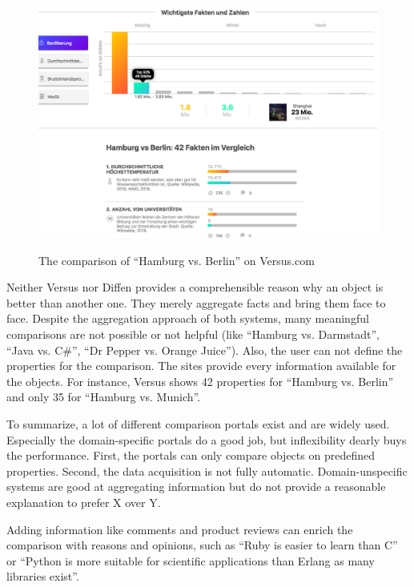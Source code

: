\begin{figure}[h]
\includegraphics[width=1\textwidth]{images/ds-sys/versus}
\label{img:versus}
\caption{The comparison of \enquote{Hamburg vs. Berlin} on Versus.com}
\end{figure}

Neither Versus nor Diffen provides a comprehensible reason why an object is better than another one. They merely aggregate facts and bring them face to face. Despite the aggregation approach of both systems, many meaningful comparisons are not possible or not helpful (like \enquote{Hamburg vs. Darmstadt}, \enquote{Java vs. C\#}, \enquote{Dr Pepper vs. Orange Juice}).
Also, the user can not define the properties for the comparison. The sites provide every information available for the objects. For instance, Versus shows 42 properties for \enquote{Hamburg vs. Berlin} and only 35 for \enquote{Hamburg vs. Munich}.
\newline

To summarize, a lot of different comparison portals exist and are widely used. Especially the domain-specific portals do a good job, but inflexibility dearly buys the performance. First, the portals can only compare objects on predefined properties. Second, the data acquisition is not fully automatic. Domain-unspecific systems are good at aggregating information but do not provide a reasonable explanation to prefer X over Y.

Adding information like comments and product reviews can enrich the comparison with reasons and opinions, such as \enquote{Ruby is easier to learn than C} or \enquote{Python is more suitable for scientific applications than Erlang as many libraries exist}.


